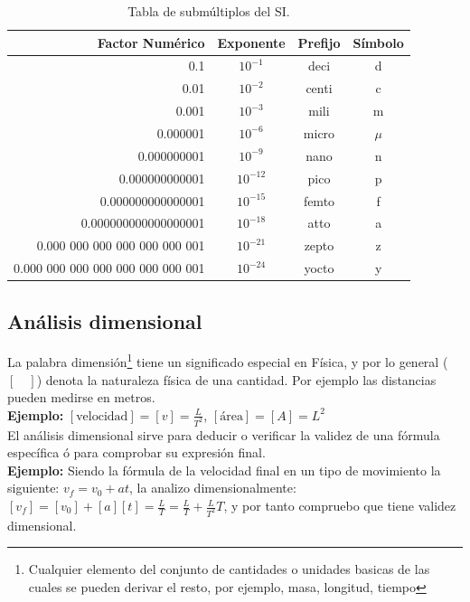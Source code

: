 \begin{table}[H]
 \begin{center}
\begin{tabular}{rccc}
\hline
Factor Numérico & Exponente & Prefijo & Símbolo\\
\hline
0.1 & $10^{-1}$ & deci & d\\
0.01 & $10^{-2}$ & centi & c\\
0.001 & $10^{-3}$ & mili & m\\
0.000001 & $10^{-6}$ & micro & $\mu$\\
0.000000001 & $10^{-9}$ & nano  & n\\
0.000000000001 & $10^{-12}$ & pico & p\\
0.000000000000001 & $10^{-15}$ & femto & f\\
0.000000000000000001 & $10^{-18}$  & atto & a\\
0.000 000 000 000 000 000 001 & $10^{-21}$ & zepto & z\\
0.000 000 000 000 000 000 000 001 & $10^{-24}$ & yocto & y\\
\hline
\end{tabular}
\caption{Tabla de submúltiplos del SI.}
 \end{center}
 \end{table}
 
\subsection{Análisis dimensional}

La palabra dimensión\footnote{Cualquier elemento del conjunto de cantidades o unidades basicas de las cuales se pueden derivar el 
resto, por ejemplo, masa, longitud, tiempo} tiene un significado especial en Física, y por lo general ($[\quad]$) denota la 
naturaleza física de una cantidad. Por ejemplo las distancias pueden medirse en metros.\\

\textbf{Ejemplo:} $[\text{velocidad}] = [v] =\frac{L}{T^2}$, $[\text{área}] = [A] = L^2$\\
 
El análisis dimensional sirve para deducir o verificar la validez de una fórmula específica ó para comprobar su expresión final.\\

\textbf{Ejemplo:} Siendo la fórmula de la velocidad final en un tipo de movimiento la siguiente: $v_f = v_0 + at$, la analizo 
dimensionalmente: $[v_f] = [v_0] + [a][t] = \frac{L}{T} = \frac{L}{T} + \frac{L}{T^2}T$, y por tanto compruebo que tiene validez 
dimensional.

